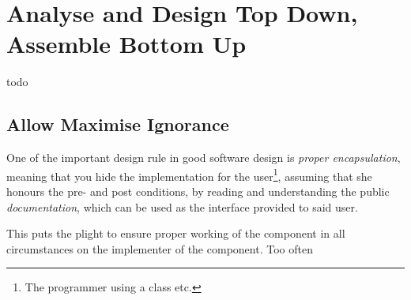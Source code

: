 \documentclass[\docroot/main]{subfiles}
\begin{document}
\section{Analyse and Design Top Down, Assemble Bottom Up}
todo

\subsection{Allow Maximise Ignorance}
One of the important design rule in good software design is \textit{proper
encapsulation}, meaning that you hide the implementation for the
user\footnote{The programmer using a class etc.}, assuming that she
honours the pre- and post conditions, by reading and understanding the
public \textit{documentation}, which can be used as the interface
provided to said user.

This puts the plight to ensure proper working of the component in all
circumstances on the implementer of the component. Too often 
\end{document}
